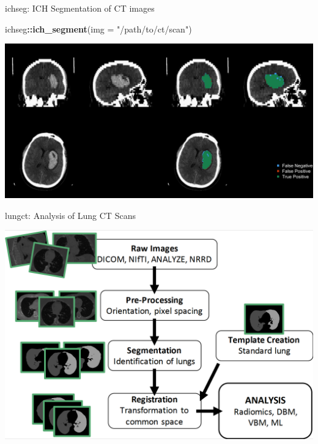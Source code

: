 \documentclass[ignorenonframetext,]{beamer}
\newenvironment{Shaded}{\begin{snugshade}}{\end{snugshade}}
\newcommand{\DataTypeTok}[1]{\textcolor[rgb]{0.13,0.29,0.53}{#1}}
\newcommand{\KeywordTok}[1]{\textcolor[rgb]{0.13,0.29,0.53}{\textbf{#1}}}
\newcommand{\NormalTok}[1]{#1}
\newcommand{\OperatorTok}[1]{\textcolor[rgb]{0.81,0.36,0.00}{\textbf{#1}}}
\newcommand{\StringTok}[1]{\textcolor[rgb]{0.31,0.60,0.02}{#1}}
\begin{document}
\begin{frame}[fragile]{ichseg: ICH Segmentation of CT images }
\protect\hypertarget{ichseg-ich-segmentation-of-ct-images}{}

\begin{Shaded}
\begin{Highlighting}[]
\NormalTok{ichseg}\OperatorTok{::}\KeywordTok{ich_segment}\NormalTok{(}\DataTypeTok{img =} \StringTok{"/path/to/ct/scan"}\NormalTok{)}
\end{Highlighting}
\end{Shaded}

\begin{center}\includegraphics[width=0.85\linewidth]{figures/ichseg_example} \end{center}

\end{frame}

\begin{frame}{lungct: Analysis of Lung CT Scans }
\protect\hypertarget{lungct-analysis-of-lung-ct-scans}{}

\begin{center}\includegraphics[width=0.75\linewidth]{figures/lungct_pipeline} \end{center}

\end{frame}
\end{document}
